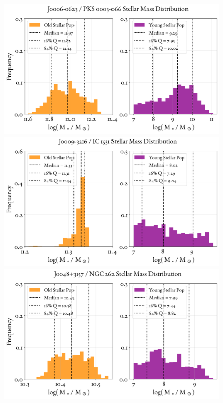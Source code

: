 \begin{figure}
    \centering
    \includegraphics[width=0.8\linewidth]{figures/ResultMasses/0_MassDistri_10.png}\\
    \includegraphics[width=0.8\linewidth]{figures/ResultMasses/1_MassDistri_16.png}\\
    \includegraphics[width=0.8\linewidth]{figures/ResultMasses/2_MassDistri_103.png}    
\end{figure}
